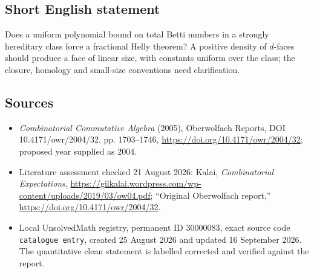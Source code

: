 \documentclass[11pt]{article}
\begin{document}
\subsection{Short English statement}
Does a uniform polynomial bound on total Betti numbers in a strongly hereditary class force a fractional Helly theorem? A positive density of $d$-faces should produce a face of linear size, with constants uniform over the class; the closure, homology and small-size conventions need clarification.
\subsection{Sources}
\begin{itemize}
\item \emph{Combinatorial Commutative Algebra} (2005), Oberwolfach Reports, DOI 10.4171/owr/2004/32, pp. 1703--1746, \url{https://doi.org/10.4171/owr/2004/32}; proposed year supplied as 2004.
\item Literature assessment checked 21 August 2026: Kalai, \emph{Combinatorial Expectations}, \url{https://gilkalai.wordpress.com/wp-content/uploads/2019/03/ow04.pdf}; ``Original Oberwolfach report,'' \url{https://doi.org/10.4171/owr/2004/32}.
\item Local UnsolvedMath registry, permanent ID $30000083$, exact source code \texttt{catalogue entry}, created 25 August 2026 and updated 16 September 2026. The quantitative clean statement is labelled corrected and verified against the report.
\end{itemize}
\end{document}
